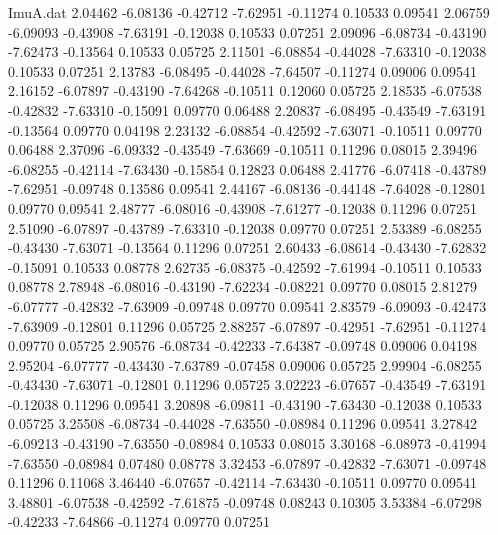 \begin{filecontents}{ImuA.dat}
   2.04462   -6.08136   -0.42712   -7.62951   -0.11274    0.10533    0.09541
   2.06759   -6.09093   -0.43908   -7.63191   -0.12038    0.10533    0.07251
   2.09096   -6.08734   -0.43190   -7.62473   -0.13564    0.10533    0.05725
   2.11501   -6.08854   -0.44028   -7.63310   -0.12038    0.10533    0.07251
   2.13783   -6.08495   -0.44028   -7.64507   -0.11274    0.09006    0.09541
   2.16152   -6.07897   -0.43190   -7.64268   -0.10511    0.12060    0.05725
   2.18535   -6.07538   -0.42832   -7.63310   -0.15091    0.09770    0.06488
   2.20837   -6.08495   -0.43549   -7.63191   -0.13564    0.09770    0.04198
   2.23132   -6.08854   -0.42592   -7.63071   -0.10511    0.09770    0.06488
   2.37096   -6.09332   -0.43549   -7.63669   -0.10511    0.11296    0.08015
   2.39496   -6.08255   -0.42114   -7.63430   -0.15854    0.12823    0.06488
   2.41776   -6.07418   -0.43789   -7.62951   -0.09748    0.13586    0.09541
   2.44167   -6.08136   -0.44148   -7.64028   -0.12801    0.09770    0.09541
   2.48777   -6.08016   -0.43908   -7.61277   -0.12038    0.11296    0.07251
   2.51090   -6.07897   -0.43789   -7.63310   -0.12038    0.09770    0.07251
   2.53389   -6.08255   -0.43430   -7.63071   -0.13564    0.11296    0.07251
   2.60433   -6.08614   -0.43430   -7.62832   -0.15091    0.10533    0.08778
   2.62735   -6.08375   -0.42592   -7.61994   -0.10511    0.10533    0.08778
   2.78948   -6.08016   -0.43190   -7.62234   -0.08221    0.09770    0.08015
   2.81279   -6.07777   -0.42832   -7.63909   -0.09748    0.09770    0.09541
   2.83579   -6.09093   -0.42473   -7.63909   -0.12801    0.11296    0.05725
   2.88257   -6.07897   -0.42951   -7.62951   -0.11274    0.09770    0.05725
   2.90576   -6.08734   -0.42233   -7.64387   -0.09748    0.09006    0.04198
   2.95204   -6.07777   -0.43430   -7.63789   -0.07458    0.09006    0.05725
   2.99904   -6.08255   -0.43430   -7.63071   -0.12801    0.11296    0.05725
   3.02223   -6.07657   -0.43549   -7.63191   -0.12038    0.11296    0.09541
   3.20898   -6.09811   -0.43190   -7.63430   -0.12038    0.10533    0.05725
   3.25508   -6.08734   -0.44028   -7.63550   -0.08984    0.11296    0.09541
   3.27842   -6.09213   -0.43190   -7.63550   -0.08984    0.10533    0.08015
   3.30168   -6.08973   -0.41994   -7.63550   -0.08984    0.07480    0.08778
   3.32453   -6.07897   -0.42832   -7.63071   -0.09748    0.11296    0.11068
   3.46440   -6.07657   -0.42114   -7.63430   -0.10511    0.09770    0.09541
   3.48801   -6.07538   -0.42592   -7.61875   -0.09748    0.08243    0.10305
   3.53384   -6.07298   -0.42233   -7.64866   -0.11274    0.09770    0.07251

\end{filecontents}
